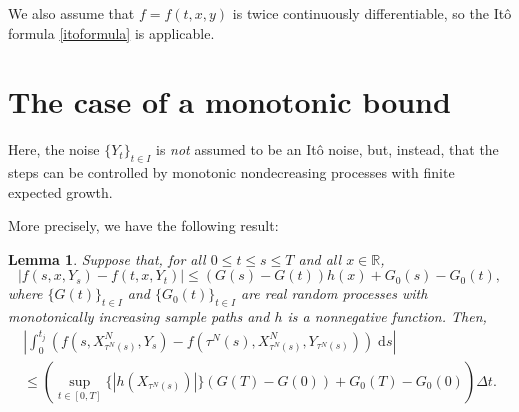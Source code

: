 \documentclass[reqno,12pt]{amsart}
\theoremstyle{plain}%
\newtheorem{lem}{Lemma}[section]
\theoremstyle{definition}
\begin{document}
We also assume that $f=f(t, x, y)$ is twice continuously differentiable, so the It\^o formula \eqref{itoformula} is applicable.

\section{The case of a monotonic bound}

Here, the noise $\{Y_t\}_{t\in I}$ is \emph{not} assumed to be an It\^o noise, but, instead, that the steps can be controlled by monotonic nondecreasing processes with finite expected growth.

More precisely, we have the following result:
\begin{lem}
    Suppose that, for all $0 \leq t \leq s \leq T$ and all $x\in \mathbb{R}$,
    \[
        |f(s, x, Y_s) - f(t, x, Y_t)| \leq (G(s) - G(t)) h(x) + G_0(s) - G_0(t),
    \]
    where $\{G(t)\}_{t\in I}$ and $\{G_0(t)\}_{t\in I}$ are real random processes with monotonically increasing sample paths and $h$ is a nonnegative function. Then,
    \begin{multline*}
        \left|\int_0^{t_j} \left( f(s, X_{\tau^N(s)}^N, Y_s) - f(\tau^N(s), X_{\tau^N(s)}^N, Y_{\tau^N(s)}) \right)\;\mathrm{d}s\right| \\
         \leq \left(\sup_{t\in [0, T]}\{|h(X_{\tau^N(s)})|\}(G(T) - G(0)) + G_0(T) - G_0(0) \right)\Delta t. 
    \end{multline*}
\end{lem}
\end{document}
